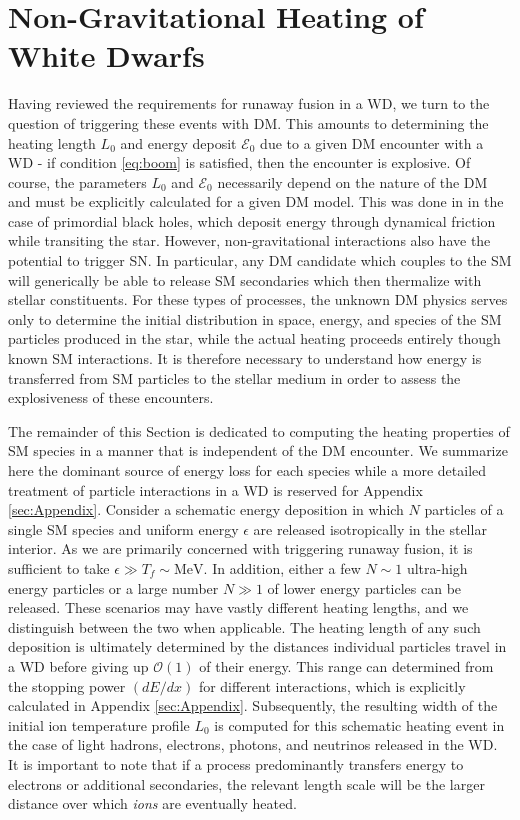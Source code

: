 \documentclass[twocolumn,showpacs,preprintnumbers,amsmath,amssymb,prd]{revtex4}
\newcommand{\Ez}{\mathcal{E}_0}
\newcommand{\OO}{\mathcal{O}}
\begin{document}
\section{Non-Gravitational Heating of White Dwarfs}
\label{sec:SMHeating}

Having reviewed the requirements for runaway fusion in a WD, we turn to the question of triggering these events with DM. 
This amounts to determining the heating length $L_0$ and energy deposit $\Ez$ due to a given DM encounter with a WD - if condition \eqref{eq:boom} is satisfied, then the encounter is explosive.
Of course, the parameters $L_0$ and $\Ez$ necessarily depend on the nature of the DM and must be explicitly calculated for a given DM model. 
This was done in \cite{Graham:2015apa} in the case of primordial black holes, which deposit energy through dynamical friction while transiting the star.
However, non-gravitational interactions also have the potential to trigger SN. 
In particular, any DM candidate which couples to the SM will generically be able to release SM secondaries which then thermalize with stellar constituents. 
For these types of processes, the unknown DM physics serves only to determine the initial distribution in space, energy, and species of the SM particles produced in the star, while the actual heating proceeds entirely though known SM interactions. 
It is therefore necessary to understand how energy is transferred from SM particles to the stellar medium in order to assess the explosiveness of these encounters.

The remainder of this Section is dedicated to computing the heating properties of SM species in a manner that is independent of the DM encounter. 
We summarize here the dominant source of energy loss for each species while a more detailed treatment of particle interactions in a WD is reserved for Appendix \ref{sec:Appendix}. 
Consider a schematic energy deposition in which $N$ particles of a single SM species and uniform energy $\epsilon$ are released isotropically in the stellar interior.
As we are primarily concerned with triggering runaway fusion, it is sufficient to take $\epsilon \gg T_f \sim \text{MeV}$.
In addition, either a few $N \sim 1$ ultra-high energy particles or a large number $N \gg 1$ of lower energy particles can be released. 
These scenarios may have vastly different heating lengths, and we distinguish between the two when applicable. 
The heating length of any such deposition is ultimately determined by the distances individual particles travel in a WD before giving up $\OO(1)$ of their energy.
This range can determined from the stopping power $(dE/dx)$ for different interactions, which is explicitly calculated in Appendix \ref{sec:Appendix}. 
Subsequently, the resulting width of the initial ion temperature profile $L_0$ is computed for this schematic heating event in the case of light hadrons, electrons, photons, and neutrinos released in the WD. 
It is important to note that if a process predominantly transfers energy to electrons or additional secondaries, the relevant length scale will be the larger distance over which \emph{ions} are eventually heated. 
\end{document}
